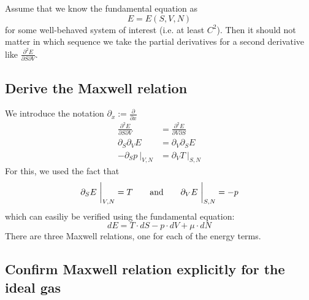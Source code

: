 Assume that we know the fundamental equation as 
\begin{equation}
    E=E(S,V,N) 
\end{equation}
for some well-behaved system of interest (i.e. at least $C^2$). Then it should 
not matter in which sequence we take the partial derivatives for a second 
derivative like $\frac{\partial^2 E}{\partial S\partial V}$.

\subsection{Derive the Maxwell relation}
We introduce the notation $\partial_x:=\frac{\partial}{\partial x}$
\begin{align}
    \frac{\partial^2 E}{\partial S\partial V}
    &=\frac{\partial^2 E}{\partial V\partial S} \\
    \partial_S\partial_V E &=\partial_V\partial_S E \\
    -\partial_S p\ \bigg|_{V,N} &= \partial_V T\ \bigg|_{S,N} 
\end{align}
For this, we used the fact that
\begin{equation}
    \partial_S E\ \bigg|_{V,N}=T
    \ \ \ \ \ \ \textnormal{and}\ \ \ \ \ \
    \partial_V E\ \bigg|_{S,N}=-p
\end{equation}
which can easiliy be verified using the fundamental equation:
\begin{equation}
    dE=T\cdot dS-p\cdot dV+\mu\cdot dN
\end{equation}
There are three Maxwell relations, one for each of the energy terms.


\subsection{Confirm Maxwell relation explicitly for the ideal gas}
